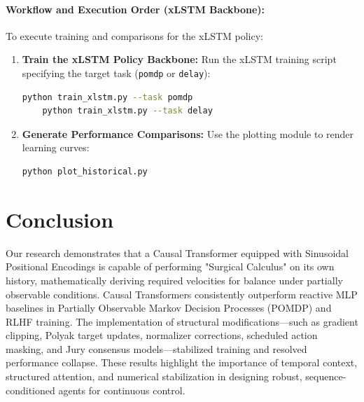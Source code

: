\documentclass[11pt,a4paper]{article}
\begin{document}
\paragraph{Workflow and Execution Order (xLSTM Backbone):}
To execute training and comparisons for the xLSTM policy:
\begin{enumerate}
    \item \textbf{Train the xLSTM Policy Backbone:} Run the xLSTM training script specifying the target task (\texttt{pomdp} or \texttt{delay}):
    \begin{lstlisting}[language=bash]
    python train_xlstm.py --task pomdp
    python train_xlstm.py --task delay
    \end{lstlisting}
    \item \textbf{Generate Performance Comparisons:} Use the plotting module to render learning curves:
    \begin{lstlisting}[language=bash]
    python plot_historical.py
    \end{lstlisting}
\end{enumerate}

\FloatBarrier
\section{Conclusion}
Our research demonstrates that a Causal Transformer equipped with Sinusoidal Positional Encodings is capable of performing "Surgical Calculus" on its own history, mathematically deriving required velocities for balance under partially observable conditions. Causal Transformers consistently outperform reactive MLP baselines in Partially Observable Markov Decision Processes (POMDP) and RLHF training. The implementation of structural modifications---such as gradient clipping, Polyak target updates, normalizer corrections, scheduled action masking, and Jury consensus models---stabilized training and resolved performance collapse. These results highlight the importance of temporal context, structured attention, and numerical stabilization in designing robust, sequence-conditioned agents for continuous control.
\end{document}
